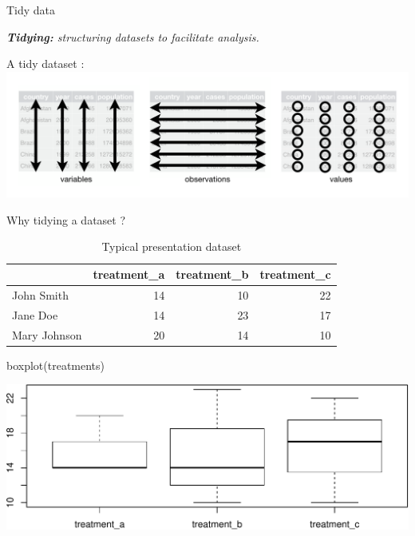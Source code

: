 \documentclass[14pt,ignorenonframetext,]{bredelebeamer}
\newenvironment{Shaded}{\begin{snugshade}}{\end{snugshade}}
\newcommand{\KeywordTok}[1]{\textcolor[rgb]{0.94,0.87,0.69}{#1}}
\newcommand{\NormalTok}[1]{\textcolor[rgb]{0.80,0.80,0.80}{#1}}
\begin{document}
\begin{frame}{Tidy data}

\begin{Large}
\textit{\textbf{Tidying:} structuring datasets to facilitate analysis.}
\end{Large}\begin{center}
A tidy dataset :\\
\includegraphics{images/tidy-1.png}

\end{center}

\end{frame}

\begin{frame}[fragile]{Why tidying a dataset ?}

\begin{table}[t]

\caption{\label{tab:show1}Typical presentation dataset}
\centering
\begin{tabular}{lrrr}
\toprule
  & treatment\_a & treatment\_b & treatment\_c\\
\midrule
\rowcolor{gray!6}  John Smith & 14 & 10 & 22\\
Jane Doe & 14 & 23 & 17\\
\rowcolor{gray!6}  Mary Johnson & 20 & 14 & 10\\
\bottomrule
\end{tabular}
\end{table}

\begin{Shaded}
\begin{Highlighting}[]
\KeywordTok{boxplot}\NormalTok{(treatments)}
\end{Highlighting}
\end{Shaded}

\includegraphics{tidyverse_28_03_files/figure-beamer/boxplot1-1.pdf}

\end{frame}
\end{document}
